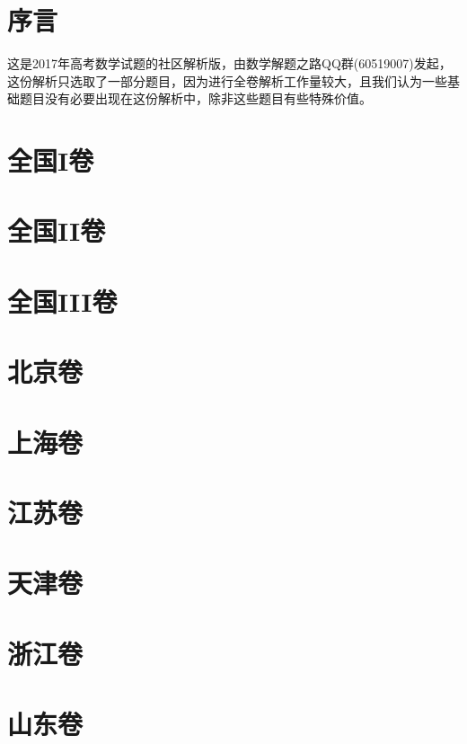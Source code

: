\documentclass{ctexart}
\title{\kaishu{2017年高考数学试题选析}}
\author{数学解题之路QQ群(60519007)}
\date{更新于: \today}
\begin{document}
\maketitle

\tableofcontents

\section{序言}
\label{sec:preface}

这是2017年高考数学试题的社区解析版，由数学解题之路QQ群(60519007)发起，这份解析只选取了一部分题目，因为进行全卷解析工作量较大，且我们认为一些基础题目没有必要出现在这份解析中，除非这些题目有些特殊价值。

\section{全国I卷}
\label{sec:nation-1}

\section{全国II卷}
\label{sec:nation-2}

\section{全国III卷}
\label{sec:nation-3}

\section{北京卷}
\label{sec:beijing}

\section{上海卷}
\label{sec:shanghai}

\section{江苏卷}
\label{sec:jiangshu}

\section{天津卷}
\label{sec:tianjin}

\section{浙江卷}
\label{sec:zhejiang}

\section{山东卷}
\label{sec:shandong}
\end{document}
